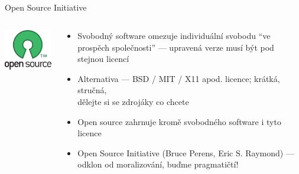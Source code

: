 \documentclass{beamer}
\begin{document}
\subsection{}
\begin{frame}{Open Source Initiative}
\begin{columns}
\begin{column}{4cm}
\includegraphics[width=4cm]{opensource-rgb.pdf}
\end{column}
\begin{column}{7cm}
\begin{itemize}
\item Svobodný software omezuje individuální svobodu ``ve prospěch společnosti'' --- upravená verze musí být pod stejnou licencí
\item Alternativa --- BSD / MIT / X11 apod. licence; krátká, stručná,\\dělejte si se zdrojáky co chcete
\item Open source zahrnuje kromě svobodného software i tyto licence
\item Open Source Initiative (Bruce Perens, Eric S. Raymond) --- odklon od moralizování, buďme pragmatičtí!
\end{itemize}
\end{column}
\end{columns}
\end{frame}
\end{document}

